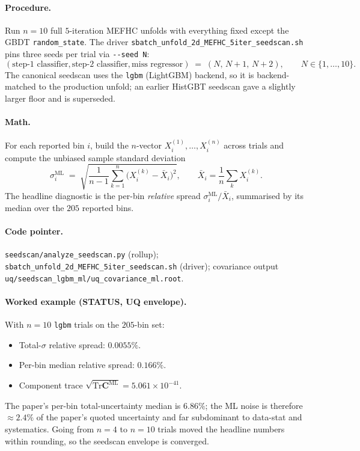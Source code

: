\documentclass[12pt]{article}
\newcommand{\ML}{\text{ML}}
\newcommand{\Tr}{\mathrm{Tr}}
\begin{document}
\paragraph{Procedure.}
Run $n=10$ full $5$-iteration MEFHC unfolds with everything fixed
except the GBDT \texttt{random\_state}. The driver
\texttt{sbatch\_unfold\_2d\_MEFHC\_5iter\_seedscan.sh} pins three
seeds per trial via \texttt{-{}-seed N}:
\begin{equation}
(\text{step-1 classifier},\text{step-2 classifier},\text{miss regressor})
\;=\;
(N,\,N+1,\,N+2),
\qquad N \in \{1,\dots,10\}.
\end{equation}
The canonical seedscan uses the \texttt{lgbm} (LightGBM) backend, so
it is backend-matched to the production unfold; an earlier HistGBT
seedscan gave a slightly larger floor and is superseded.

\paragraph{Math.}
For each reported bin $i$, build the $n$-vector $X_{i}^{(1)},\dots,
X_{i}^{(n)}$ across trials and compute the unbiased sample standard
deviation
\begin{equation}
\sigma^{\ML}_{i}
\;=\;
\sqrt{\frac{1}{n-1}\sum_{k=1}^{n}\big(X^{(k)}_{i}-\bar X_{i}\big)^{2}},
\qquad
\bar X_{i} = \frac{1}{n}\sum_{k} X^{(k)}_{i}.
\end{equation}
The headline diagnostic is the per-bin \emph{relative} spread
$\sigma^{\ML}_{i}/\bar X_{i}$, summarised by its median over the
$205$ reported bins.

\paragraph{Code pointer.}
\texttt{seedscan/analyze\_seedscan.py} (rollup);
\texttt{sbatch\_unfold\_2d\_MEFHC\_5iter\_seedscan.sh} (driver);
covariance output \texttt{uq/seedscan\_lgbm\_ml/uq\_covariance\_ml.root}.

\paragraph{Worked example (STATUS, UQ envelope).}
With $n=10$ \texttt{lgbm} trials on the $205$-bin set:
\begin{itemize}[nosep]
  \item Total-$\sigma$ relative spread: $\boxed{0.0055\%}$.
  \item Per-bin median relative spread: $\boxed{0.166\%}$.
  \item Component trace $\sqrt{\Tr\mathbf{C}^{\ML}} = 5.061\times10^{-41}$.
\end{itemize}
The paper's per-bin total-uncertainty median is $6.86\%$; the ML
noise is therefore $\approx 2.4\%$ of the paper's quoted uncertainty
and far subdominant to data-stat and systematics. Going from $n=4$ to
$n=10$ trials moved the headline numbers within rounding, so the
seedscan envelope is converged.
\end{document}
